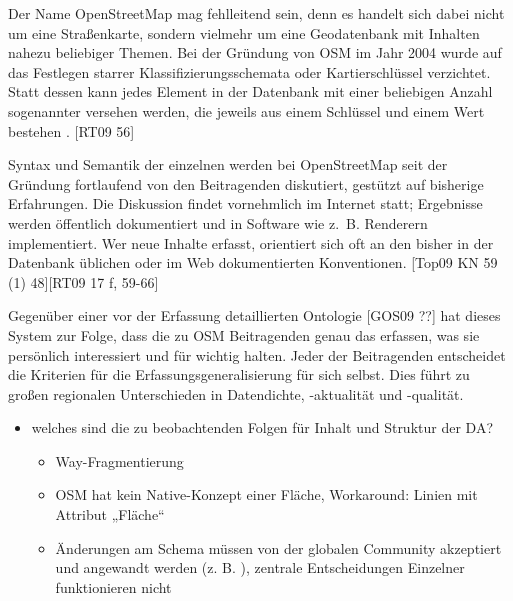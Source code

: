 \documentclass{../thesis}
\begin{document}


Der Name OpenStreetMap mag fehlleitend sein, denn es handelt sich dabei nicht um eine Straßenkarte, sondern vielmehr um eine Geodatenbank mit Inhalten nahezu beliebiger Themen. Bei der Gründung von OSM im Jahr 2004 wurde auf das Festlegen starrer Klassifizierungsschemata oder Kartierschlüssel verzichtet. Statt dessen kann jedes Element in der Datenbank mit einer beliebigen Anzahl sogenannter  versehen werden, die jeweils aus einem Schlüssel und einem Wert bestehen . [RT09 56]


Syntax und Semantik der einzelnen  werden bei OpenStreetMap seit der Gründung fortlaufend von den Beitragenden diskutiert, gestützt auf bisherige Erfahrungen. Die Diskussion findet vornehmlich im Internet statt; Ergebnisse werden öffentlich dokumentiert und in Software wie z.~B. Renderern implementiert. Wer neue Inhalte erfasst, orientiert sich oft an den bisher in der Datenbank üblichen oder im Web dokumentierten Konventionen. [Top09 KN 59 (1) 48][RT09 17 f, 59-66]

Gegenüber einer vor der Erfassung detaillierten Ontologie [GOS09 ??] hat dieses System zur Folge, dass die zu OSM Beitragenden genau das erfassen, was sie persönlich interessiert und für wichtig halten. Jeder der Beitragenden entscheidet die Kriterien für die Erfassungsgeneralisierung für sich selbst. Dies führt zu großen regionalen Unterschieden in Datendichte, -aktualität und -qualität.








\biggap

\begin{itemize}
	\item welches sind die zu beobachtenden Folgen für Inhalt und Struktur der DA?
	\begin{itemize}
		\item Way-Fragmentierung
		\item OSM hat kein Native-Konzept einer Fläche, Workaround: Linien mit Attribut „Fläche“
		\item Änderungen am Schema müssen von der globalen Community akzeptiert und angewandt werden (z. B. \cite{Sch09}), zentrale Entscheidungen Einzelner funktionieren nicht
	\end{itemize}
\end{itemize}
\end{document}
